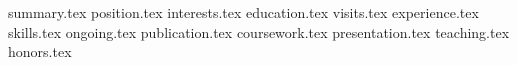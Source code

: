 \documentclass[11pt, a4paper]{awesome-cv}
\newcommand*{\sectiondir}{cv/}
\begin{document}
\makecvheader
\vspace{5pt}
{summary.tex}
{position.tex}
{interests.tex}
{education.tex}
{visits.tex}
{experience.tex}
{skills.tex}
{ongoing.tex}
{publication.tex}
{coursework.tex}
{presentation.tex}
{teaching.tex}
{honors.tex}
\end{document}
